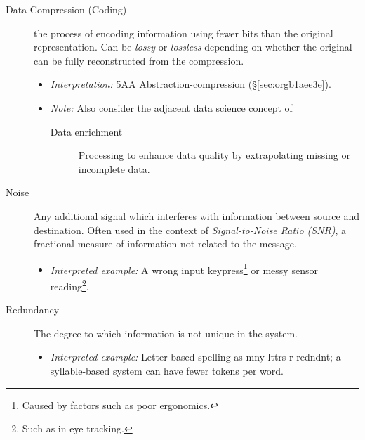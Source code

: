 \documentclass[logo,bsc,singlespacing,parskip]{infthesis}
\begin{document}
{\begin{mdframed}
\begin{description}
\item[{Data Compression (Coding)}] the process of encoding information using fewer bits than the original representation. Can be \emph{lossy} or \emph{lossless} depending on whether the original can be fully reconstructed from the compression.
\begin{itemize}
\item \emph{Interpretation:} \hyperref[sec:orgb1aee3e]{5AA Abstraction-compression} (\S \ref{sec:orgb1aee3e}).
\item \emph{Note:} Also consider the adjacent data science concept of
\begin{description}
\item[{Data enrichment}] Processing to enhance data quality by extrapolating missing or incomplete data.
\end{description}
\end{itemize}
\end{description}
\end{mdframed}

\begin{mdframed}
\begin{description}
\item[{Noise\label{noise}}] Any additional signal which interferes with information between source and destination.
Often used in the context of \emph{Signal-to-Noise Ratio (SNR)}, a fractional measure of information not related to the message.
\begin{itemize}
\item \emph{Interpreted example:} A wrong input keypress\footnote{Caused by factors such as poor ergonomics.} or messy sensor reading\footnote{Such as in eye tracking.}.
\end{itemize}
\end{description}
\end{mdframed}

\begin{mdframed}
\begin{description}
\item[{Redundancy}] The degree to which information is not unique in the system.
\begin{itemize}
\item \emph{Interpreted example:} Letter-based spelling as mny lttrs r redndnt; a syllable-based system can have fewer tokens per word.
\end{itemize}
\end{description}
\end{mdframed}

}
\end{document}
